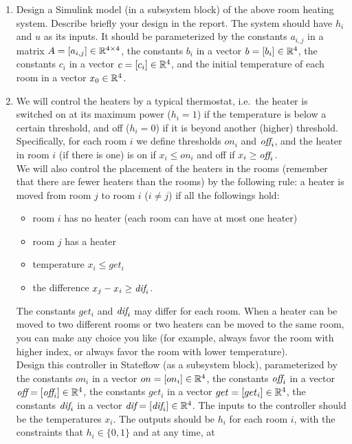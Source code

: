 \documentclass[11]{article}
\begin{document}
\begin{enumerate}
\item Design a Simulink model (in a subsystem block) of the above room
  heating system.  Describe briefly your design in the report.  The
  system should have $h_i$ and $u$ as its inputs.  It should be
  parameterized by the constants $a_{i,j}$ in a matrix $A = [a_{i,j}]
  \in \mathbb{R}^{4\times 4}$, the constants $b_i$ in a vector $b = [b_i] \in
  \mathbb{R}^4$, the constants $c_i$ in a vector $c = [c_i] \in \mathbb{R}^4$, and
  the initial temperature of each room in a vector $x_0 \in \mathbb{R}^4$.
\item We will control the heaters by a typical thermostat, i.e.\ the
  heater is switched on at its maximum power ($h_i = 1$) if the
  temperature is below a certain threshold, and off ($h_i = 0$) if it
  is beyond another (higher) threshold.  Specifically, for each room
  $i$ we define thresholds $on_i$ and $\mbox{{\it off}}_i$, and the heater in room
  $i$ (if there is one) is on if $x_i \leq on_i$ and off if $x_i \geq
  \mbox{{\it off}}_i$.\\
  We will also control the placement of the heaters in the rooms
  (remember that there are fewer heaters than the rooms) by the
  following rule: a heater is moved from room $j$ to room $i$ ($i \neq
  j$) if all the followings hold:
  \begin{itemize}
  \item room $i$ has no heater (each room can have at most one heater)
  \item room $j$ has a heater
  \item temperature $x_i \leq get_i$
  \item the difference $x_j - x_i \geq \mbox{{\it dif}}_i$.
  \end{itemize}
  The constants $get_i$ and $\mbox{{\it dif}}_i$ may differ for each room.  When a
  heater can be moved to two different rooms or two heaters can be
  moved to the same room, you can make any choice you like (for
  example, always favor the room with higher index, or always favor
  the room with lower temperature).\\
  Design this controller in Stateflow (as a subsystem block),
  parameterized by the constants $on_i$ in a vector $on = [on_i] \in
  \mathbb{R}^4$, the constants $\mbox{{\it off}}_i$ in a vector $\mbox{{\it off}} = [\mbox{{\it off}}_i] \in
  \mathbb{R}^4$, the constants $get_i$ in a vector $get = [get_i] \in
  \mathbb{R}^4$, the constants $\mbox{{\it dif}}_i$ in a vector $\mbox{{\it dif}} = [\mbox{{\it dif}}_i] \in
  \mathbb{R}^4$.  The inputs to the controller should be the temperatures
  $x_i$.  The outputs should be $h_i$ for each room $i$,
  with the constraints that $h_i \in \{0,1\}$ and at any time, at

\end{enumerate}
\end{document}
